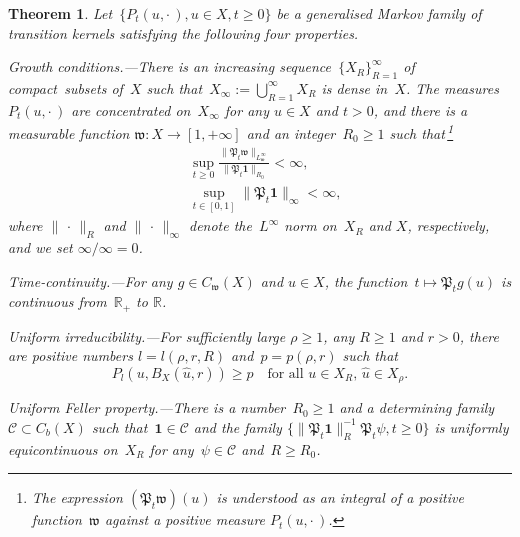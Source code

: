 \documentclass[10pt]{amsart}
\newtheorem{theo}{Theorem}[section]
\theoremstyle{definition}\newtheorem{defi}[theo]{Definition}\newtheorem{rema}[theo]{Remark}\newtheorem{exam}[theo]{Example}\newtheorem{exem}[theo]{Example}\newtheorem{nota}[theo]{Notation}
\newcommand{\mek}{{\mathbf 1}}
\newcommand{\R}{{\mathbb R}}
\newcommand{\CC}{{\mathcal C}}
\newcommand{\ty}{\infty}
\newcommand{\wwww}{{\mathfrak w}}
\newcommand{\PPPP}{{\mathfrak P}}
\providecommand{\pointir}{.\enspace---\enspace}
\begin{document}
\begin{theo}\label{T:5.3}
Let~$\{P_t(u,{\cdot\,}),u\in X, t\ge0\} $ be a generalised Markov family of transition kernels satisfying the following four properties.

Growth conditions\pointir There is an increasing sequence~$\{X_R\}_{R=1}^\infty$ of compact~subsets of~$X$ such that~$X_\infty:=\bigcup_{R=1}^\ty X_R$ is dense in~$X$. The measures~$P_{t}(u,{\cdot\,})$ are concentrated on~$X_\infty$ for any $u\in X$ and $t>0$, and there is a measurable function $\wwww:X\to[1,+\infty]$ and an integer~$R_0\ge1$ such that\,\footnote{The expression $(\PPPP_t\wwww)(u)$ is understood as an integral of a positive function~$\wwww$ against a positive measure $P_t(u,{\cdot\,})$.}
\begin{align*}
&\sup_{t\ge0}
\frac{\|\PPPP_t\wwww\|_{L_\wwww^\infty}}{\|\PPPP_t{\mek}\|_{R_0}}<\infty,\\
&\sup_{t\in [0,1]} \|\PPPP_t{\mek}\|_{\infty}<\ty,
\end{align*}
where $\|{\,\cdot\,}\|_R$ and $\|{\,\cdot\,}\|_\ty$ denote the~$L^\infty$ norm on~$X_R$ and $X$, respectively, and we set $\infty/\infty=0$.

Time-continuity\pointir For any $g\in C_\wwww(X)$ and $u\in X$, the function~$t\mapsto\PPPP_tg(u) $ is continuous from~$\R_+$ to $\R$.

Uniform irreducibility\pointir For sufficiently large $\rho\ge1$, any $R\ge 1$ and $r>0$, there are positive numbers $l=l(\rho,r,R)$ and~$p=p(\rho,r)$ such that
\[
P_l(u,B_{X}(\hat u,r))\ge p\quad\mbox{for all~$u\in X_R,\,\hat u\in X_\rho$}.
\]

Uniform Feller property\pointir There is a number~$R_0\ge1$ and a determining family~$\CC\subset C_b(X)$ such that~$\mek\in\CC$ and the family $\{\|\PPPP_t{\mek}\|_R^{-1}\PPPP_t\psi, t\ge0\}$ is uniformly equicontinuous on~$X_R$ for any~$\psi\in \CC$ and~$R\ge R_0$.


\end{theo}
\end{document}
